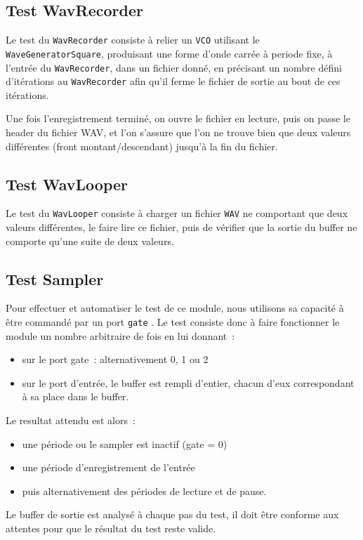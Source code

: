 \subsection{Test WavRecorder}

Le test du \verb!WavRecorder! consiste à relier un \verb!VCO!
utilisant le \verb!WaveGeneratorSquare!, produisant une forme
d'onde carrée à periode fixe, à l'entrée du \verb!WavRecorder!,
dans un fichier donné, en précisant un nombre défini d'itérations
au \verb!WavRecorder! afin qu'il ferme le fichier de sortie au bout
de ces itérations.

Une fois l'enregistrement terminé, on ouvre le fichier en lecture,
puis on passe le header du fichier WAV, et l'on s'assure que l'on
ne trouve bien que deux valeurs différentes (front
montant/descendant) jusqu'à la fin du fichier.

\subsection{Test WavLooper}

Le test du \verb!WavLooper! consiste à charger un fichier
\verb!WAV! ne comportant que deux valeurs différentes, le faire
lire ce fichier, puis de vérifier que la sortie du buffer ne
comporte qu'une suite de deux valeurs.

\subsection{Test Sampler}
Pour effectuer et automatiser le test de ce module, nous utilisons sa capacité à être commandé par un port \texttt{gate}
. Le test consiste donc à faire fonctionner le module un nombre arbitraire de fois en lui donnant~: 
\begin{itemize}
    \item sur le port gate~: alternativement 0, 1 ou 2
    \item sur le port d'entrée, le buffer est rempli d'entier, chacun d'eux correspondant à sa place dans le buffer.
\end{itemize}
Le resultat attendu est alors~:
\begin{itemize}
    \item une période ou le sampler est inactif (gate = 0)
    \item une période d'enregistrement de l'entrée
    \item puis alternativement des périodes de lecture et de pause.
\end{itemize}

Le buffer de sortie est analysé à chaque pas du test, il doit être conforme aux attentes pour que le résultat du test reste valide.

